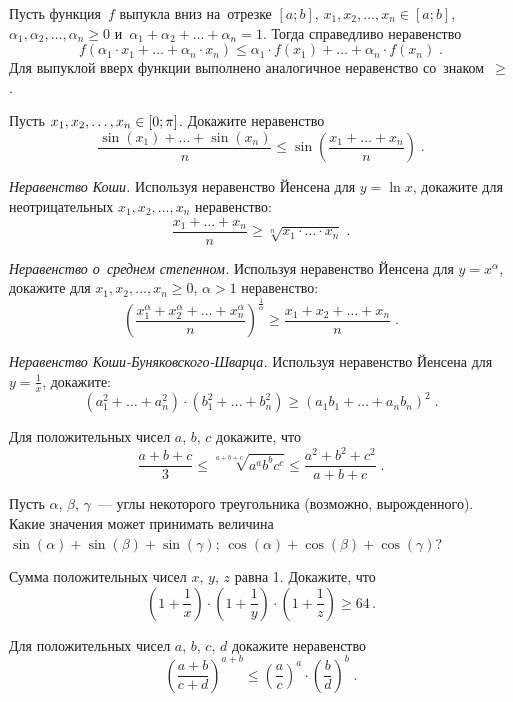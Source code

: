 \begin{problems}

\item{}
Пусть функция~$f$ выпукла вниз на~отрезке $[a;b]$,
$x_1, x_2, \ldots, x_n \in [a; b]$,
$\alpha_1, \alpha_2, \ldots, \alpha_n \geq 0$
и~$\alpha_1 + \alpha_2 + \ldots + \alpha_n = 1$.
Тогда справедливо неравенство
\[
    f(\alpha_1 \cdot x_1 + \ldots + \alpha_n \cdot x_n)
\leq
    \alpha_1 \cdot f(x_1) + \ldots + \alpha_n \cdot f(x_n)
\; . \]
Для выпуклой вверх функции выполнено аналогичное неравенство со~знаком~$\geq$.

\item
Пусть $x_1, x_2, \ldots, x_n \in [0; \mathrm{\pi}]$.
Докажите неравенство
\[
    \frac{\sin(x_1) + \ldots + \sin(x_n)}{n}
\leq
    \sin\left(
        \frac{x_1 + \ldots + x_n}{n}
    \right)
\; . \]

\item\emph{Неравенство Коши.}
Используя неравенство Йенсена для $y = \ln x$, докажите для неотрицательных
$x_1, x_2, \ldots, x_n$ неравенство:
\[
    \frac{x_1 + \ldots + x_n}{n}
\geq
    \sqrt[n]{x_1 \cdot \ldots \cdot x_n}
\; . \]

\item\emph{Неравенство о~среднем степенном.}
Используя неравенство Йенсена для $y = x^{\alpha}$, докажите для
$x_1, x_2, \ldots, x_n \geq 0$, $\alpha > 1$ неравенство:
\[
    \left(
        \frac{
            x_1^{\alpha} + x_2^{\alpha} + \ldots + x_n^{\alpha}
        }{n}
    \right)^{\frac{1}{\alpha}}
\geq
    \frac{x_1 + x_2 + \ldots + x_n}{n}
\; . \]

\item\emph{Неравенство Коши-Буняковского-Шварца.}
Используя неравенство Йенсена для $y = \frac{1}{x}$, докажите:
\[
    (a_1^2 + \ldots + a_n^2) \cdot (b_1^2 + \ldots + b_n^2)
\geq
    (a_1 b_1 + \ldots + a_n b_n)^2
\; . \]

\item
Для положительных чисел $a$, $b$, $c$ докажите, что
\[
    \frac{a + b + c}{3}
\leq
    \sqrt[a+b+c]{a^a b^b c^c}
\leq
    \frac{a^2 + b^2 + c^2}{a + b + c}
\; . \]

\item
Пусть $\alpha$, $\beta$, $\gamma$~--- углы некоторого треугольника
(возможно, вырожденного).
Какие значения может принимать величина
\\
\subproblem $\sin(\alpha) + \sin(\beta) + \sin(\gamma)$;
\quad
\subproblem $\cos(\alpha) + \cos(\beta) + \cos(\gamma)$?

\item
Сумма положительных чисел $x$, $y$, $z$ равна 1.
Докажите, что
\[
    \left( 1 + \frac{1}{x} \right) \cdot
    \left( 1 + \frac{1}{y} \right) \cdot
    \left( 1 + \frac{1}{z} \right)
\geq
    64
\, . \]

\item
Для положительных чисел $a$, $b$, $c$, $d$ докажите неравенство
\[
    \left(\frac{a+b}{c+d}\right)^{a+b}
\leq
    \left(\frac{a}{c}\right)^a
    \cdot
    \left(\frac{b}{d}\right)^b
\; . \]

\end{problems}

\endgroup %

